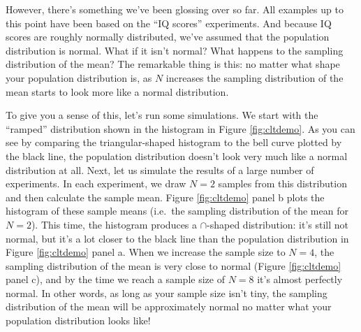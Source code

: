 \documentclass[
]{book}
\theoremstyle{definition}
\theoremstyle{definition}
\theoremstyle{definition}
\theoremstyle{definition}
\theoremstyle{remark}
\begin{document}
However, there's something we've been glossing over so far. All examples up to this point have been based on the ``IQ scores'' experiments. And because IQ scores are roughly normally distributed, we've assumed that the population distribution is normal. What if it isn't normal? What happens to the sampling distribution of the mean? The remarkable thing is this: no matter what shape your population distribution is, as \(N\) increases the sampling distribution of the mean starts to look more like a normal distribution.

To give you a sense of this, let's run some simulations. We start with the ``ramped'' distribution shown in the histogram in Figure \ref{fig:cltdemo}. As you can see by comparing the triangular-shaped histogram to the bell curve plotted by the black line, the population distribution doesn't look very much like a normal distribution at all. Next, let us simulate the results of a large number of experiments. In each experiment, we draw \(N=2\) samples from this distribution and then calculate the sample mean. Figure \ref{fig:cltdemo} panel b plots the histogram of these sample means (i.e.~the sampling distribution of the mean for \(N=2\)). This time, the histogram produces a \(\cap\)-shaped distribution: it's still not normal, but it's a lot closer to the black line than the population distribution in Figure \ref{fig:cltdemo} panel a. When we increase the sample size to \(N=4\), the sampling distribution of the mean is very close to normal (Figure \ref{fig:cltdemo} panel c), and by the time we reach a sample size of \(N=8\) it's almost perfectly normal. In other words, as long as your sample size isn't tiny, the sampling distribution of the mean will be approximately normal no matter what your population distribution looks like!
\end{document}
